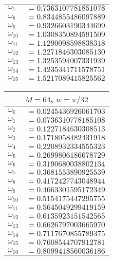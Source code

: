 \begin{table}[p]
\begin{minipage}[t]{3in}
\begin{tabular}{l@{}l}
$\omega_{7}$ & ${}=0.7363107781851078$ \\
$\omega_{8}$ & ${}=0.8344855486097889$ \\
$\omega_{9}$ & ${}=0.9326603190344699$ \\
$\omega_{10}$ & ${}=1.0308350894591509$ \\
$\omega_{11}$ & ${}=1.1290098598838318$ \\
$\omega_{12}$ & ${}=1.2271846303085130$ \\
$\omega_{13}$ & ${}=1.3253594007331939$ \\
$\omega_{14}$ & ${}=1.4235341711578751$ \\
$\omega_{15}$ & ${}=1.5217089415825562$ \\
\bottomrule
\end{tabular}%
\end{minipage}%
%
\begin{minipage}[t]{3in}
\null%
\begin{tabular}{l@{}l} \toprule
\multicolumn{2}{c}{$M=64$, $w=\pi / 32$ } \\ \midrule
$\omega_{0}$ & ${}=0.0245436926061703$ \\
$\omega_{1}$ & ${}=0.0736310778185108$ \\
$\omega_{2}$ & ${}=0.1227184630308513$ \\
$\omega_{3}$ & ${}=0.1718058482431918$ \\
$\omega_{4}$ & ${}=0.2208932334555323$ \\
$\omega_{5}$ & ${}=0.2699806186678729$ \\
$\omega_{6}$ & ${}=0.3190680038802134$ \\
$\omega_{7}$ & ${}=0.3681553890925539$ \\
$\omega_{8}$ & ${}=0.4172427743048944$ \\
$\omega_{9}$ & ${}=0.4663301595172349$ \\
$\omega_{10}$ & ${}=0.5154175447295755$ \\
$\omega_{11}$ & ${}=0.5645049299419159$ \\
$\omega_{12}$ & ${}=0.6135923151542565$ \\
$\omega_{13}$ & ${}=0.6626797003665970$ \\
$\omega_{14}$ & ${}=0.7117670855789375$ \\
$\omega_{15}$ & ${}=0.7608544707912781$ \\
$\omega_{16}$ & ${}=0.8099418560036186$ \\

\end{tabular}
\end{minipage}
\end{table}
